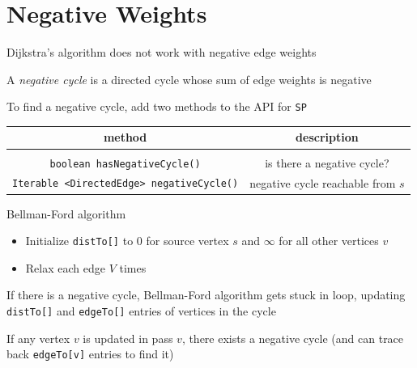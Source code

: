 \documentclass[8pt,a4paper,compress]{beamer}
\begin{document}
\section{Negative Weights}
\begin{frame}[fragile]
Dijkstra's algorithm does not work with negative edge weights

\bigskip

A \emph{negative cycle} is a directed cycle whose sum of edge weights is negative

\bigskip

To find a negative cycle, add two methods to the API for \lstinline{SP}
\begin{center}
\begin{tabular}{cc}
method & description \\ \hline \\
\lstinline$boolean hasNegativeCycle()$ & is there a negative cycle? \\
\lstinline$Iterable <DirectedEdge> negativeCycle()$ & negative cycle reachable from $s$
\end{tabular}  
\end{center}

\bigskip

Bellman-Ford algorithm
\begin{itemize}
\item Initialize \lstinline{distTo[]} to 0 for source vertex $s$ and $\infty$ for all other vertices $v$
\item Relax each edge $V$ times
\end{itemize}

\bigskip

If there is a negative cycle, Bellman-Ford algorithm gets stuck in loop, updating \lstinline{distTo[]} and \lstinline{edgeTo[]} entries of vertices in the cycle

\bigskip

If any vertex $v$ is updated in pass $v$, there exists a negative
cycle (and can trace back \lstinline{edgeTo[v]} entries to find it)
\end{frame}
\end{document}
